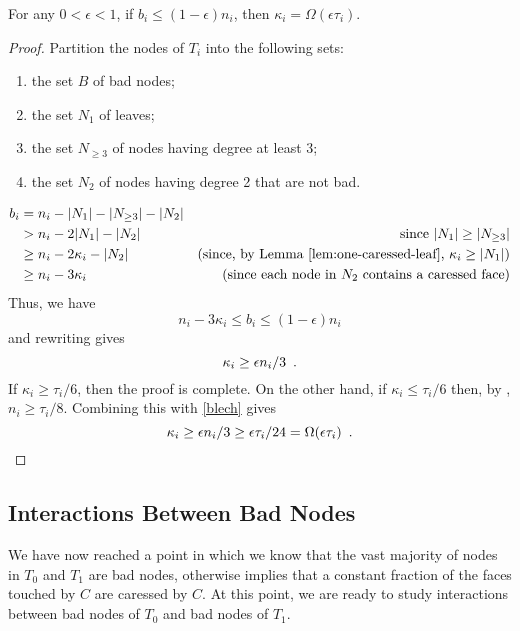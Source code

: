 \documentclass{patmorin}
\begin{document}
\begin{lem}
   For any $0<\epsilon < 1$, if $b_i \le (1-\epsilon)n_i$, then
   $\kappa_i = \Omega(\epsilon\tau_i)$.
\end{lem}

\begin{proof}
   Partition the nodes of $T_i$ into the following sets:
   \begin{enumerate}
       \item the set $B$ of bad nodes;
       \item the set $N_1$ of leaves;
       \item the set $N_{\ge 3}$ of nodes having degree at least 3;
       \item the set $N_2$ of nodes having degree 2 that are not bad.
   \end{enumerate}
   \begin{align*}
     b_i & = n_i - |N_1|- |N_{\ge 3}|-|N_2| \\
	   & > n_i - 2|N_1|-|N_2| & \text{since $|N_1|\ge |N_{\ge 3}|$} \\
         & \ge  n_i - 2\kappa_i -|N_2| 
	   & \text{(since, by \lemref{one-caressed-leaf}, $\kappa_i\ge |N_1|$)} \\
           & \ge  n_i - 3\kappa_i 
           & \text{(since each node in $N_2$ contains a caressed face)}
    \end{align*}
    Thus, we have
    \[
          n_i-3\kappa_i \le b_i \le (1-\epsilon)n_i
    \]
    and rewriting gives 
    \begin{equation}
      \kappa_i \ge \epsilon n_i/3 \enspace . \eqlabel{blech}
    \end{equation}
    If $\kappa_i \ge \tau_i/6$, then the proof is complete.  On the other hand, if $\kappa_i \le \tau_i/6$ then, by , $n_i \ge \tau_i/8$. Combining this with \eqref{blech}  gives
    \[
      \kappa_i \ge \epsilon n_i/3 \ge \epsilon\tau_i/24 = \Omega(\epsilon \tau_i) \enspace . \qedhere
    \]
\end{proof}

\subsection{Interactions Between Bad Nodes}

We have now reached a point in which we know that the vast
majority of nodes in $T_0$ and $T_1$ are bad nodes, otherwise
 implies that a constant fraction of the
faces touched by $C$ are caressed by $C$.  At this point, we are ready
to study interactions between bad nodes of $T_0$ and bad nodes of $T_1$.
\end{document}
